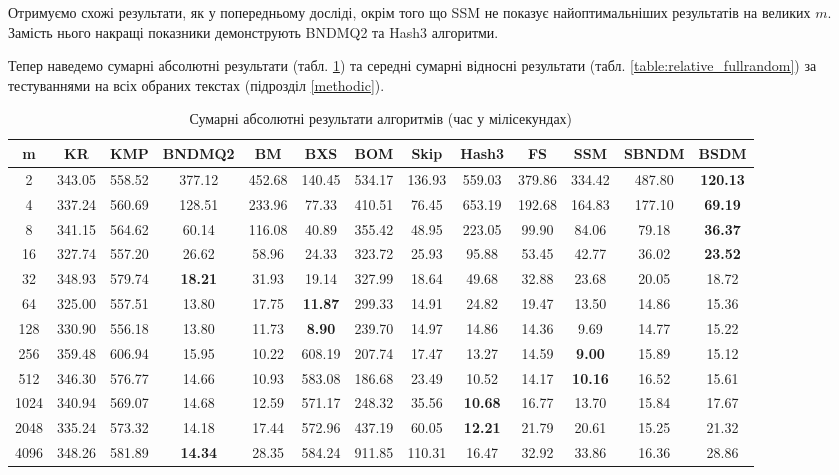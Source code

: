 \documentclass[a4paper,14pt]{extarticle} %
\begin{document}
			Отримуємо схожі результати, як у попередньому досліді, окрім того що SSM не показує найоптимальніших результатів на великих $m$. Замість нього накращі показники демонструють BNDMQ2 та Hash3 алгоритми.
			
			Тепер наведемо сумарні абсолютні результати (табл. \ref{table:absolute_fullrandom}) та середні сумарні відносні результати (табл. \ref{table:relative_fullrandom}) за тестуваннями на всіх обраних текстах (підрозділ \ref{methodic}).

			\begin{table}[H]
				\centering
				\scriptsize
				\begin{tabular}{|c|c|c|c|c|c|c|c|c|c|c|c|c|}
				\hline
				\textbf{m} & \textbf{KR} & \textbf{KMP} & \textbf{BNDMQ2} & \textbf{BM} & \textbf{BXS} & \textbf{BOM} & \textbf{Skip} & \textbf{Hash3} & \textbf{FS} & \textbf{SSM} & \textbf{SBNDM} & \textbf{BSDM} \\
				\hline
				2 & 343.05 & 558.52 & 377.12 & 452.68 & 140.45 & 534.17 & 136.93 & 559.03 & 379.86 & 334.42 & 487.80 & \textbf{120.13} \\
				\hline
				4 & 337.24 & 560.69 & 128.51 & 233.96 & 77.33 & 410.51 & 76.45 & 653.19 & 192.68 & 164.83 & 177.10 & \textbf{69.19} \\
				\hline
				8 & 341.15 & 564.62 & 60.14 & 116.08 & 40.89 & 355.42 & 48.95 & 223.05 & 99.90 & 84.06 & 79.18 & \textbf{36.37} \\
				\hline
				16 & 327.74 & 557.20 & 26.62 & 58.96 & 24.33 & 323.72 & 25.93 & 95.88 & 53.45 & 42.77 & 36.02 & \textbf{23.52} \\
				\hline
				32 & 348.93 & 579.74 & \textbf{18.21} & 31.93 & 19.14 & 327.99 & 18.64 & 49.68 & 32.88 & 23.68 & 20.05 & 18.72 \\
				\hline
				64 & 325.00 & 557.51 & 13.80 & 17.75 & \textbf{11.87} & 299.33 & 14.91 & 24.82 & 19.47 & 13.50 & 14.86 & 15.36 \\
				\hline
				128 & 330.90 & 556.18 & 13.80 & 11.73 & \textbf{8.90} & 239.70 & 14.97 & 14.86 & 14.36 & 9.69 & 14.77 & 15.22 \\
				\hline
				256 & 359.48 & 606.94 & 15.95 & 10.22 & 608.19 & 207.74 & 17.47 & 13.27 & 14.59 & \textbf{9.00} & 15.89 & 15.12 \\
				\hline
				512 & 346.30 & 576.77 & 14.66 & 10.93 & 583.08 & 186.68 & 23.49 & 10.52 & 14.17 & \textbf{10.16} & 16.52 & 15.61 \\
				\hline
				1024 & 340.94 & 569.07 & 14.68 & 12.59 & 571.17 & 248.32 & 35.56 & \textbf{10.68} & 16.77 & 13.70 & 15.84 & 17.67 \\
				\hline
				2048 & 335.24 & 573.32 & 14.18 & 17.44 & 572.96 & 437.19 & 60.05 & \textbf{12.21} & 21.79 & 20.61 & 15.25 & 21.32 \\
				\hline
				4096 & 348.26 & 581.89 & \textbf{14.34} & 28.35 & 584.24 & 911.85 & 110.31 & 16.47 & 32.92 & 33.86 & 16.36 & 28.86 \\
				\hline
				\end{tabular}
				\caption{Сумарні абсолютні результати алгоритмів (час у мілісекундах)}
				\label{table:absolute_fullrandom}
				\end{table}
\end{document}
